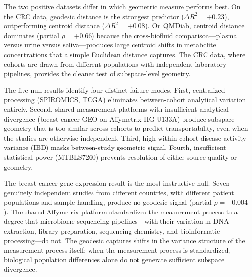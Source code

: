 \documentclass{article}
\begin{document}
The two positive datasets differ in which geometric measure performs best. On the CRC data, geodesic distance is the strongest predictor ($\Delta R^2 = +0.23$), outperforming centroid distance ($\Delta R^2 = +0.08$). On QMDiab, centroid distance dominates (partial $\rho = +0.66$) because the cross-biofluid comparison---plasma versus urine versus saliva---produces large centroid shifts in metabolite concentrations that a simple Euclidean distance captures. The CRC data, where cohorts are drawn from different populations with independent laboratory pipelines, provides the cleaner test of subspace-level geometry.

The five null results identify four distinct failure modes. First, centralized processing (SPIROMICS, TCGA) eliminates between-cohort analytical variation entirely. Second, shared measurement platforms with insufficient analytical divergence (breast cancer GEO on Affymetrix HG-U133A) produce subspace geometry that is too similar across cohorts to predict transportability, even when the studies are otherwise independent. Third, high within-cohort disease-activity variance (IBD) masks between-study geometric signal. Fourth, insufficient statistical power (MTBLS7260) prevents resolution of either source quality or geometry.

The breast cancer gene expression result is the most instructive null. Seven genuinely independent studies from different countries, with different patient populations and sample handling, produce no geodesic signal (partial $\rho = -0.004$). The shared Affymetrix platform standardizes the measurement process to a degree that microbiome sequencing pipelines---with their variation in DNA extraction, library preparation, sequencing chemistry, and bioinformatic processing---do not. The geodesic captures shifts in the variance structure of the measurement process itself; when the measurement process is standardized, biological population differences alone do not generate sufficient subspace divergence.
\end{document}
